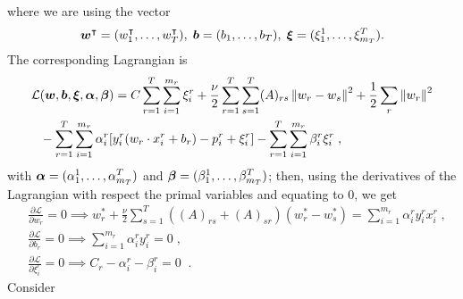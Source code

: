 where we are using the vector
\begin{equation}
    \nonumber
    \bm{w}^\intercal = (w_1^\intercal, \ldots, w_T^\intercal), \; \bm{b} = (b_1, \ldots, b_T), \; \bm{\xi} = (\xi_{1}^1, \ldots, \xi_{m_T}^T).
\end{equation}
The corresponding Lagrangian is
\begin{equation}\label{eq:svmmtl_lagr_GL_addreg}
    \begin{aligned}
        \mathcal{L} & (\fv{w}, \fv{b}, \fv{\xi}, \fv{\alpha}, \fv{\beta}) = C \sum_{r=1}^T \sum_{i=1}^{m_r}{\xi_{i}^r} + \frac{\nu}{2} \sum_{r=1}^T \sum_{s=1}^T (A)_{rs} \norm{w_r - w_s}^2 + \frac{1}{2} \sum_r \norm{w_r}^2 \\
                    & - \sum_{r=1}^T \sum_{i=1}^{m_r}{ \alpha_i^r [y_{i}^r (w_r \cdot x_{i}^r + b_r) - p_{i}^r + \xi_{i}^r]   } - \sum_{r=1}^T \sum_{i=1}^{m_r}{ \beta_i^r \xi_i^r } \; ,
    \end{aligned}
\end{equation}
with $\bm{\alpha} = (\alpha_{1}^1, \ldots, \alpha_{m_T}^T)$ and $\bm{\beta} = (\beta_{1}^1, \ldots, \beta_{m_T}^T)$;
then, using the derivatives of the Lagrangian with respect the primal variables and equating to $0$, we get
\begin{align}
     & \frac{\partial \mathcal{L}}{\partial w_r} = 0 \implies  w_r^* + \frac{\nu}{2} \sum_{s=1}^T ((A)_{rs} + (A)_{sr}) (w_r^* - w_s^*)= \sum_{i=1}^{m_r}{\alpha_i^r y_i^r x_i^r} \label{eq:partial_w_r_addreg} \; , \\
     & \frac{\partial \mathcal{L}}{\partial b_r} = 0 \implies  \sum_{i=1}^{m_r}{\alpha_i^r y_i^r } = 0 \label{eq:partial_b_r_addreg} \; ,                                                                        \\
     & \frac{\partial \mathcal{L}}{\partial \xi_i^r} = 0 \implies C_r - \alpha_i^r - \beta_i^r = 0 \; \label{eq:partial_xi_addreg}\; .
\end{align}
Consider

